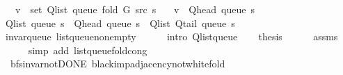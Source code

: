 \begin{isabellebody}
\ \ \ {\isachardoublequoteopen}v\ {\isasymnotin}\ set\ {\isacharparenleft}{\kern0pt}Q{\isacharunderscore}{\kern0pt}list\ {\isacharparenleft}{\kern0pt}queue\ {\isacharparenleft}{\kern0pt}fold\ G\ src\ s{\isacharparenright}{\kern0pt}{\isacharparenright}{\kern0pt}{\isacharparenright}{\kern0pt}{\isachardoublequoteclose}\isanewline
\ \ \ {\isachardoublequoteopen}v\ {\isacharequal}{\kern0pt}\ Q{\isacharunderscore}{\kern0pt}head\ {\isacharparenleft}{\kern0pt}queue\ s{\isacharparenright}{\kern0pt}{\isachardoublequoteclose}%
\endisataginvisible
{\isafoldinvisible}%
%
\isadeliminvisible
\isanewline
%
\endisadeliminvisible
%
\isadelimproof
%
\endisadelimproof
%
\isatagproof
{}\isamarkupfalse%
\ {\isacharminus}{\kern0pt}\isanewline
\ \ \isamarkupfalse%
\ {\isachardoublequoteopen}Q{\isacharunderscore}{\kern0pt}list\ {\isacharparenleft}{\kern0pt}queue\ s{\isacharparenright}{\kern0pt}\ {\isacharequal}{\kern0pt}\ Q{\isacharunderscore}{\kern0pt}head\ {\isacharparenleft}{\kern0pt}queue\ s{\isacharparenright}{\kern0pt}\ {\isacharhash}{\kern0pt}\ Q{\isacharunderscore}{\kern0pt}list\ {\isacharparenleft}{\kern0pt}Q{\isacharunderscore}{\kern0pt}tail\ {\isacharparenleft}{\kern0pt}queue\ s{\isacharparenright}{\kern0pt}{\isacharparenright}{\kern0pt}{\isachardoublequoteclose}\isanewline
\ \ \ \ \isamarkupfalse%
\ invar{\isacharunderscore}{\kern0pt}queue\ list{\isacharunderscore}{\kern0pt}queue{\isacharunderscore}{\kern0pt}non{\isacharunderscore}{\kern0pt}empty\isanewline
\ \ \ \ \isamarkupfalse%
\ {\isacharparenleft}{\kern0pt}intro\ Q{\isachardot}{\kern0pt}list{\isacharunderscore}{\kern0pt}queue{\isacharparenright}{\kern0pt}\isanewline
\ \ \isamarkupfalse%
\ {\isacharquery}{\kern0pt}thesis\isanewline
\ \ \ \ \isamarkupfalse%
\ assms\isanewline
\ \ \ \ \isamarkupfalse%
\ {\isacharparenleft}{\kern0pt}simp\ add{\isacharcolon}{\kern0pt}\ list{\isacharunderscore}{\kern0pt}queue{\isacharunderscore}{\kern0pt}fold{\isacharunderscore}{\kern0pt}cong{\isacharparenright}{\kern0pt}\isanewline
{}\isamarkupfalse%
%
\endisatagproof
{\isafoldproof}%
%
\isadelimproof
\isanewline
%
\endisadelimproof
\isanewline
{}\isamarkupfalse%
\ {\isacharparenleft}{\kern0pt}\ bfs{\isacharunderscore}{\kern0pt}invar{\isacharunderscore}{\kern0pt}not{\isacharunderscore}{\kern0pt}DONE{\isacharparenright}{\kern0pt}\ black{\isacharunderscore}{\kern0pt}imp{\isacharunderscore}{\kern0pt}adjacency{\isacharunderscore}{\kern0pt}not{\isacharunderscore}{\kern0pt}white{\isacharunderscore}{\kern0pt}fold{\isacharcolon}{\kern0pt}\isanewline

\end{isabellebody}
